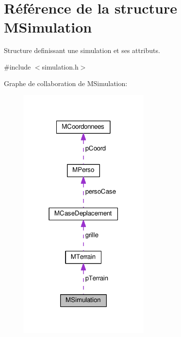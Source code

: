 \hypertarget{structMSimulation}{}\section{Référence de la structure M\+Simulation}
\label{structMSimulation}


Structure definissant une simulation et ses attributs.  




{\ttfamily \#include $<$simulation.\+h$>$}



Graphe de collaboration de M\+Simulation\+:
\nopagebreak
\begin{figure}[H]
\begin{center}
\leavevmode
\includegraphics[width=186pt]{structMSimulation__coll__graph}
\end{center}
\end{figure}
